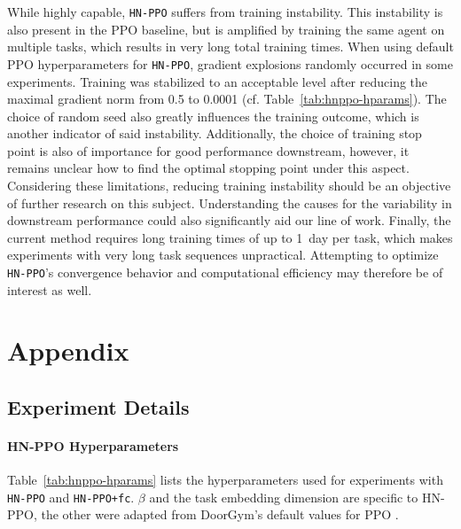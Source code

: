 \documentclass[dvipsnames]{article} %
\newcommand{\commentOLD}[1]{}
\newcommand{\saOLD}[1] {\commentOLD{{\color{cyan} SA: #1}}}                %
\begin{document}
While highly capable, \texttt{HN-PPO} suffers from training instability. This instability is also present in the PPO baseline, but is amplified by training the same agent on multiple tasks, which results in very long total training times. When using default PPO hyperparameters for \texttt{HN-PPO}, gradient explosions randomly occurred in some experiments. Training was stabilized to an acceptable level after reducing the maximal gradient norm from 0.5 to 0.0001 (cf. Table~\ref{tab:hnppo-hparams}). The choice of random seed also greatly influences the training outcome, which is another indicator of said instability. Additionally, the choice of training stop point is also of importance for good performance downstream, however, it remains unclear how to find the optimal stopping point under this aspect. Considering these limitations, reducing training instability should be an objective of further research on this subject. Understanding the causes for the variability in downstream performance could also significantly aid our line of work. Finally, the current method requires long training times of up to 1~day per task, which makes experiments with very long task sequences unpractical. Attempting to optimize \texttt{HN-PPO}'s convergence behavior and computational efficiency may therefore be of interest as well.





\appendix
\section{Appendix}
\subsection{Experiment Details}
\paragraph{HN-PPO Hyperparameters}
Table~\ref{tab:hnppo-hparams} lists the hyperparameters used for experiments with \texttt{HN-PPO} and \texttt{HN-PPO+fc}. $\beta$ and the task embedding dimension are specific to HN-PPO, the other were adapted from DoorGym's default values for PPO \citep{doorgym}. 
\end{document}
